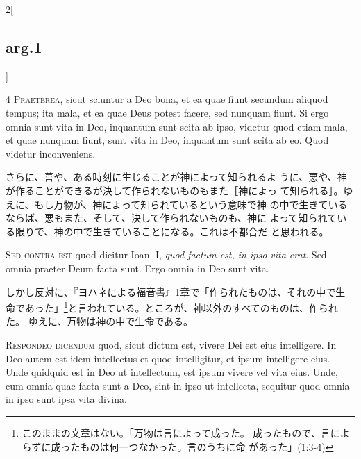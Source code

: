 \documentclass[paper=a4paper,fontsize=10pt,jafontsize=9pt,titlepage]{jlreq}
\begin{document}
\begin{paracol}{2}[\subsection{arg.1}]


{\scshape 4 Praeterea}, sicut sciuntur a Deo bona, et ea
 quae fiunt secundum aliquod tempus; ita mala, et ea quae Deus potest
 facere, sed nunquam fiunt. Si ergo omnia sunt vita in Deo, inquantum
 sunt scita ab ipso, videtur quod etiam mala, et quae nunquam fiunt,
 sunt vita in Deo, inquantum sunt scita ab eo. Quod videtur
 inconveniens.

\switchcolumn

さらに、善や、ある時刻に生じることが神によって知られるよ
 うに、悪や、神が作ることができるが決して作られないものもまた［神によっ
 て知られる］。ゆえに、もし万物が、神によって知られているという意味で神
 の中で生きているならば、悪もまた、そして、決して作られないものも、神に
 よって知られている限りで、神の中で生きていることになる。これは不都合だ
 と思われる。

\switchcolumn*[\subsection{s.c.}]


{\scshape  Sed contra est} quod dicitur Ioan. I, {\itshape quod
 factum est, in ipso vita erat}. Sed omnia praeter Deum facta sunt. Ergo
 omnia in Deo sunt vita.

\switchcolumn

しかし反対に、『ヨハネによる福音書』1章で「作られたものは、それの中で生
 命であった」\footnote{このままの文章はない。「万物は言によって成った。
 成ったもので、言によらずに成ったものは何一つなかった。言のうちに命
 があった」(1:3-4)}と言われている。ところが、神以外のすべてのものは、作られた。
 ゆえに、万物は神の中で生命である。



{\scshape Respondeo dicendum} quod, sicut dictum est,
 vivere Dei est eius intelligere. In Deo autem est idem intellectus et
 quod intelligitur, et ipsum intelligere eius. Unde quidquid est in Deo
 ut intellectum, est ipsum vivere vel vita eius. Unde, cum omnia quae
 facta sunt a Deo, sint in ipso ut intellecta, sequitur quod omnia in
 ipso sunt ipsa vita divina.

\switchcolumn


\end{paracol}
\end{document}

